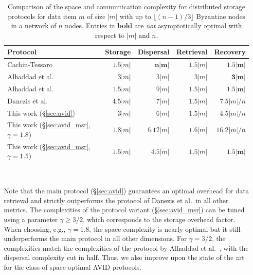 \documentclass[sigconf,screen]{acmart}
\newcommand{\yap}[1]{{\color{magenta}\emph{{[YAP]: #1}}}} %
\begin{document}
\begin{table}[t]
  \begin{center}
    \begin{tabular}{ l r r r r}
      Protocol 								& Storage 	& Dispersal 	& Retrieval 	& Recovery \\
      \hline
      Cachin-Tessaro~\cite{cachin2005} & $1.5 |m| $	& $\boldsymbol{ n |m|}$		& $1.5 |m|$	& $\boldsymbol{1.5 |m|}$ \\
      Alhaddad et al.~\cite{alhaddad2022}	& $3 |m| $	& $3 |m| $		& $3 |m|$	& $\boldsymbol{3 |m|}$ \\
      Alhaddad et al.~\cite{alhaddad2024} 	& $1.5 |m| $	& $9 |m| $		& $1.5 |m|$	& $\boldsymbol{1.5 |m|}$ \\
      Danezis et al.~\cite{danezis2025}			& $4.5 |m| $	& $7 |m| $		& $1.5 |m|$	& $7.5 {|m|}/{n}$ \\
      This work (\S\ref{sec:avid})				 & $3 |m| $	& $6 |m| $	& $1.5 |m|$	& $4.5 {|m|}/{n}$ \\
      This work (\S\ref{sec:avid_msr}, $\gamma = 1.8$) 			& $1.8 |m| $	& $6.12 |m| $		& $1.6 |m|$	& $16.2 {|m|}/{n}$ \\
      This work (\S\ref{sec:avid_msr}, $\gamma = 1.5$) 			& $1.5 |m| $	& $4.5 |m| $		& $1.5 |m|$	& $\boldsymbol{1.5 |m|}$ \\
    \end{tabular}
    \caption{Comparison of the space and communication complexity for distributed storage protocols for data item $m$ of size $|m|$ with up to $\lfloor (n-1)/3 \rfloor$ Byzantine nodes in a network of $n$ nodes. Entries in \textbf{bold} are \emph{not} asymptotically optimal with respect to $|m|$ and $n$.}~\label{tab:comparison}
  \end{center}\vspace{-14pt}
\end{table}



Note that the main protocol (\S\ref{sec:avid}) guarantees an optimal overhead for data retrieval and strictly outperforms the protocol of Danezis et al.\ in all other metrics.
The complexities of the protocol variant (\S\ref{sec:avid_msr}) can be tuned using a parameter $\gamma \ge 3/2$, which corresponds to the storage overhead factor.
When choosing, e.g., $\gamma = 1.8$, the space complexity is nearly optimal
but it still underperforms the main protocol in all other dimensions.
For $\gamma = 3/2$, the complexities match the complexities of the protocol by Alhaddad et al.~\cite{alhaddad2024}, with the dispersal complexity cut in half.
Thus, we also improve upon the state of the art for the class of space-optimal AVID protocols.
\end{document}
